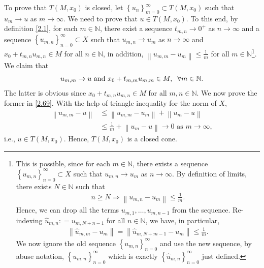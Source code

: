 \documentclass[a4paper]{article}
\numberwithin{equation}{section}
\begin{document}
\begin{enumerate}
To prove that $T\left(M,x_0\right)$ is closed, let $\left\{ {{u_n}} \right\}_{m = 0}^\infty  \subset T\left( {M,{x_0}} \right)$ such that $u_m \to u$ as $m\to \infty$. We need to prove that $u\in T\left(M,x_0\right)$. To this end, by definition \eqref{2.1}, for each $m\in \mathbb{N}$, there exist a sequence $t_{m,n} \to 0^+$ as $n\to \infty$ and a sequence $\left\{ {{u_{m,n}}} \right\}_{n = 0}^\infty  \subset X$ such that $u_{m,n}\to u_m$ as $n\to \infty$ and $x_0+t_{m,n}u_{m,n} \in M$ for all $n\in \mathbb{N}$, in addition, $\left\| {{u_{m,m}} - {u_m}} \right\| \le \frac{1}{m}$ for all $m\in \mathbb{N}$\footnote{This is possible, since for each $m\in \mathbb{N}$, there exists a sequence $\left\{ {{u_{m,n}}} \right\}_{n = 0}^\infty  \subset X$ such that $u_{m,n}\to u_m$ as $n\to \infty$. By definition of limits, there exists $N\in \mathbb{N}$ such that 
\begin{align}
n \ge N \Rightarrow \left\| {{u_{m,n}} - {u_m}} \right\| \le \frac{1}{m}.
\end{align}
Hence, we can drop all the terms $u_{m,1},\ldots,u_{m,n-1}$ from the sequence. Re-indexing ${\widehat u_{m,n}}: = {u_{m,N + n - 1}}$ for all $n\in \mathbb{N}$, we have, in particular, 
\begin{align}
\left\| {{{\widehat u}_{m,m}} - {u_m}} \right\| = \left\| {{{\widehat u}_{m,N + m - 1}} - {u_m}} \right\| \le \frac{1}{m}.
\end{align}
We now ignore the old sequence $\left\{ {{u_{m,n}}} \right\}_{n = 0}^\infty $ and use the new sequence, by abuse notation, $\left\{ {{u_{m,n}}} \right\}_{n = 0}^\infty $ which is exactly $\left\{ {{{\widehat u}_{m,n}}} \right\}_{n = 0}^\infty $ just defined.}. We claim that
\begin{align}
\label{2.69}
{u_{m,m}} \to u \mbox{ and } {x_0} + {t_{m,m}}{u_{m,m}} \in M,\hspace{0.2cm}\forall m \in \mathbb{N}.
\end{align} 
The latter is obvious since ${x_0} + {t_{m,n}}{u_{m,n}} \in M$ for all $m,n \in \mathbb{N}$. We now prove the former in \eqref{2.69}. With the help of triangle inequality for the norm of $X$, 
\begin{align}
\left\| {{u_{m,m}} - u} \right\| &\le \left\| {{u_{m,m}} - {u_m}} \right\| + \left\| {{u_m} - u} \right\|\\
& \le \frac{1}{m} + \left\| {{u_m} - u} \right\| \to 0\mbox{ as } m \to \infty ,
\end{align}
i.e., $u\in T\left(M,x_0\right)$. Hence, $T\left(M,x_0\right)$ is a closed cone. 

\end{enumerate}
\end{document}
